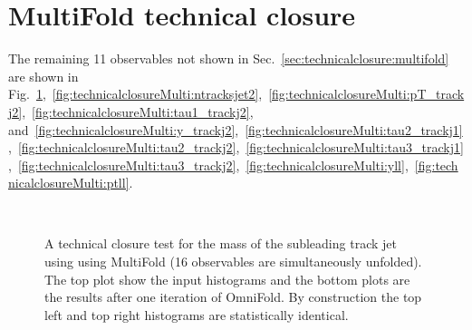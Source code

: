 \section{MultiFold technical closure}
\label{sec:multifoldtechnicalclosure}

The remaining 11 observables not shown in Sec.~\ref{sec:technicalclosure:multifold} are shown in Fig.~\ref{fig:technicalclosureMulti:mass2},~\ref{fig:technicalclosureMulti:ntracksjet2},~\ref{fig:technicalclosureMulti:pT_trackj2},~\ref{fig:technicalclosureMulti:tau1_trackj2}, and~\ref{fig:technicalclosureMulti:y_trackj2},~\ref{fig:technicalclosureMulti:tau2_trackj1},~\ref{fig:technicalclosureMulti:tau2_trackj2},~\ref{fig:technicalclosureMulti:tau3_trackj1},~\ref{fig:technicalclosureMulti:tau3_trackj2},~\ref{fig:technicalclosureMulti:yll},~\ref{fig:technicalclosureMulti:ptll}.

\begin{figure}[h!]
\centering
{}\\
\caption{A technical closure test for the mass of the subleading track jet using using MultiFold (16 observables are simultaneously unfolded).  The top plot show the input histograms and the bottom plots are the results after one iteration of OmniFold.  By construction the top left and top right histograms are statistically identical.}
\label{fig:technicalclosureMulti:mass2}
\end{figure}

